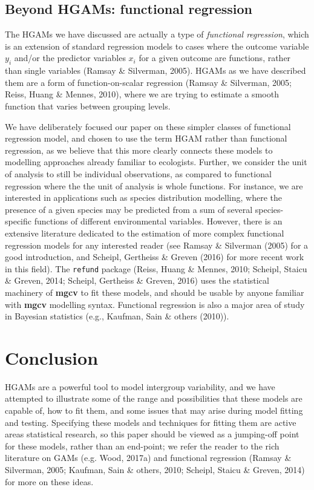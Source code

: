 \documentclass[12pt]{article}
\begin{document}
\subsection{Beyond HGAMs: functional
regression}\label{beyond-hgams-functional-regression}

The HGAMs we have discussed are actually a type of \emph{functional
regression}, which is an extension of standard regression models to
cases where the outcome variable \(y_i\) and/or the predictor variables
\(x_i\) for a given outcome are functions, rather than single variables
(Ramsay \& Silverman, 2005). HGAMs as we have described them are a form
of function-on-scalar regression (Ramsay \& Silverman, 2005; Reiss,
Huang \& Mennes, 2010), where we are trying to estimate a smooth
function that varies between grouping levels.

We have deliberately focused our paper on these simpler classes of
functional regression model, and chosen to use the term HGAM rather than
functional regression, as we believe that this more clearly connects
these models to modelling approaches already familiar to ecologists.
Further, we consider the unit of analysis to still be individual
observations, as compared to functional regression where the the unit of
analysis is whole functions. For instance, we are interested in
applications such as species distribution modelling, where the presence
of a given species may be predicted from a sum of several
species-specific functions of different environmental variables.
However, there is an extensive literature dedicated to the estimation of
more complex functional regression models for any interested reader (see
Ramsay \& Silverman (2005) for a good introduction, and Scheipl,
Gertheiss \& Greven (2016) for more recent work in this field). The
\texttt{refund} package (Reiss, Huang \& Mennes, 2010; Scheipl, Staicu
\& Greven, 2014; Scheipl, Gertheiss \& Greven, 2016) uses the
statistical machinery of \textbf{mgcv} to fit these models, and should
be usable by anyone familiar with \textbf{mgcv} modelling syntax.
Functional regression is also a major area of study in Bayesian
statistics (e.g., Kaufman, Sain \& others (2010)).

\section{Conclusion}\label{conclusion}

HGAMs are a powerful tool to model intergroup variability, and we have
attempted to illustrate some of the range and possibilities that these
models are capable of, how to fit them, and some issues that may arise
during model fitting and testing. Specifying these models and techniques
for fitting them are active areas statistical research, so this paper
should be viewed as a jumping-off point for these models, rather than an
end-point; we refer the reader to the rich literature on GAMs (e.g.
Wood, 2017a) and functional regression (Ramsay \& Silverman, 2005;
Kaufman, Sain \& others, 2010; Scheipl, Staicu \& Greven, 2014) for more
on these ideas.
\end{document}
